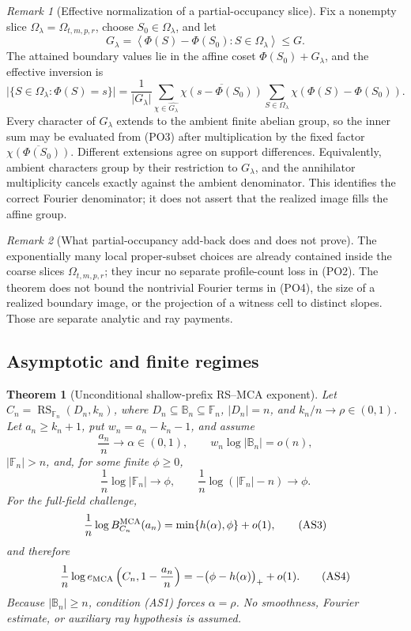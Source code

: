 \documentclass[11pt,a4paper]{amsart}
\numberwithin{equation}{section}
\newtheorem{theorem}{Theorem}[section]
\theoremstyle{remark}
\newtheorem{remark}[remark]{Remark}
\DeclareMathOperator{\RS}{RS}
\newcommand{\F}{\mathbb F}
\newcommand{\B}{\mathbb B}
\newcommand{\abs}[1]{\lvert #1\rvert}
\begin{document}
\begin{remark}[Effective normalization of a partial-occupancy slice]
Fix a nonempty slice \(\Omega_\lambda=\Omega_{t,m,p,r}\), choose
\(S_0\in\Omega_\lambda\), and let
\[
 G_\lambda=
 \left\langle\Phi(S)-\Phi(S_0):S\in\Omega_\lambda\right\rangle
 \le G.
\]
The attained boundary values lie in the affine coset
\(\Phi(S_0)+G_\lambda\), and the effective inversion is
\[
 \abs{\{S\in\Omega_\lambda:\Phi(S)=s\}}
 =\frac1{\abs{G_\lambda}}
   \sum_{\chi\in\widehat{G_\lambda}}
   \overline{\chi(s-\Phi(S_0))}
   \sum_{S\in\Omega_\lambda}
      \chi(\Phi(S)-\Phi(S_0)).                       \tag{PO5}
\]
Every character of \(G_\lambda\) extends to the ambient finite abelian
group, so the inner sum may be evaluated from \textup{(PO3)} after
multiplication by the fixed factor
\(\overline{\chi(\Phi(S_0))}\).  Different extensions agree on support
differences.  Equivalently, ambient characters group by their restriction
to \(G_\lambda\), and the annihilator multiplicity cancels exactly against
the ambient denominator.  This identifies the correct Fourier denominator;
it does not assert that the realized image fills the affine group.
\end{remark}

\begin{remark}[What partial-occupancy add-back does and does not prove]
The exponentially many local proper-subset choices are already contained
inside the coarse slices \(\Omega_{t,m,p,r}\); they incur no separate
profile-count loss in \textup{(PO2)}.  The theorem does not bound the
nontrivial Fourier terms in \textup{(PO4)}, the size of a realized
boundary image, or the projection of a witness cell to distinct slopes.
Those are separate analytic and ray payments.
\end{remark}


\subsection{Asymptotic and finite regimes}\label{sec:complementary}


\begin{theorem}[Unconditional shallow-prefix RS--MCA exponent]
\label{thm:unconditional-asymptotic-rs-mca}
Let \(C_n=\RS_{\F_n}(D_n,k_n)\), where
\(D_n\subseteq\B_n\subseteq\F_n\), \(\abs{D_n}=n\), and
\(k_n/n\to\rho\in(0,1)\).  Let \(a_n\ge k_n+1\), put
\(w_n=a_n-k_n-1\), and assume
\[
 \frac{a_n}{n}\to\alpha\in(0,1),\qquad
 w_n\log\abs{\B_n}=o(n),                           \tag{AS1}
\]
\(\abs{\F_n}>n\), and, for some finite \(\phi\ge0\),
\[
 \frac1n\log\abs{\F_n}\to\phi,
 \qquad
 \frac1n\log(\abs{\F_n}-n)\to\phi.               \tag{AS2}
\]
For the full-field challenge,
\[
 \frac1n\log B_{C_n}^{\rm MCA}(a_n)
   =\min\{h(\alpha),\phi\}+o(1),                   \tag{AS3}
\]
and therefore
\[
 \frac1n\log e_{\rm MCA}
   \left(C_n,1-\frac{a_n}{n}\right)
   =-\bigl(\phi-h(\alpha)\bigr)_++o(1).            \tag{AS4}
\]
Because \(\abs{\B_n}\ge n\), condition \textup{(AS1)} forces
\(\alpha=\rho\).  No smoothness, Fourier estimate, or auxiliary ray
hypothesis is assumed.
\end{theorem}
\end{document}
